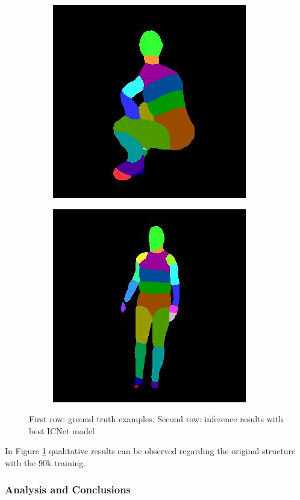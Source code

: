 \begin{figure}
\begin{subfigure}{.19\textwidth}
\end{subfigure}
\begin{subfigure}{.19\textwidth}
  \centering
  \includegraphics[scale=0.3]{19_12_c0006_29.jpg}
\end{subfigure}
\begin{subfigure}{.19\textwidth}
  \centering
  \includegraphics[scale=0.3]{ung_144_34_c0008_39.jpg}
\end{subfigure}

\caption{First row: ground truth examples. Second row: inference results with best ICNet model}
\label{icnet:inference}
\end{figure}



In Figure \ref{icnet:inference} qualitative results can be observed regarding the original structure with the 90k training.

\subsubsection{Analysis and Conclusions}

